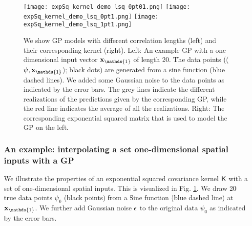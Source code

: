 \begin{figure}
	\centering
	\texttt{[image: expSq\_kernel\_demo\_lsq\_0pt01.png]}
	\texttt{[image: expSq\_kernel\_demo\_lsq\_0pt1.png]}
	\texttt{[image: expSq\_kernel\_demo\_lsq\_1pt1.png]}
	\caption{
		We show GP models with different correlation lengths (left) and their
		corresponding kernel (right).
		Left: An example GP with a one-dimensional input vector $\xv_\mathds{1}$
		of length 20. The data points (($\psi, \xv_\mathds{1}$); black dots) 
		are generated from a sine function (blue dashed lines).  
		We added some Gaussian noise to the data points as indicated by the error bars. 
		The grey lines indicate the different realizations of
		the predictions given by the corresponding GP, while the red line indicates the
		average of all the realizations.  
		Right: The corresponding exponential squared matrix that is used to model
		the GP on the left. 
		\label{fig:one_d_gaussian_process}}
\end{figure}


\subsubsection{An example:  interpolating a set one-dimensional spatial inputs
with a GP}
We illustrate the properties of an exponential squared covariance kernel
$\mathsf{K}$ with a set of one-dimensional spatial inputs. 
This is visualized in Fig. \ref{fig:one_d_gaussian_process}.
We draw 20 true data points $\psi_0$ (black points) from a Sine function (blue dashed line) at
$\xv_\mathds{1}$.
We further add Gaussian noise ${\bf\epsilon}$ to the original data $\psi_0$ as
indicated by the error bars. 

